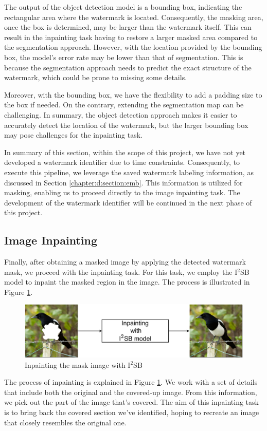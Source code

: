 The output of the object detection model is a bounding box, indicating the rectangular area where the watermark is located. Consequently, the masking area, once the box is determined, may be larger than the watermark itself. This can result in the inpainting task having to restore a larger masked area compared to the segmentation approach. However, with the location provided by the bounding box, the model's error rate may be lower than that of segmentation. This is because the segmentation approach needs to predict the exact structure of the watermark, which could be prone to missing some details.

Moreover, with the bounding box, we have the flexibility to add a padding size to the box if needed. On the contrary, extending the segmentation map can be challenging. In summary, the object detection approach makes it easier to accurately detect the location of the watermark, but the larger bounding box may pose challenges for the inpainting task.

In summary of this section, within the scope of this project, we have not yet developed a watermark identifier due to time constraints. Consequently, to execute this pipeline, we leverage the saved watermark labeling information, as discussed in Section \ref{chapter:d:section:emb}. This information is utilized for masking, enabling us to proceed directly to the image inpainting task. The development of the watermark identifier will be continued in the next phase of this project.
\subsection{Image Inpainting}
Finally, after obtaining a masked image by applying the detected watermark mask, we proceed with the inpainting task. For this task, we employ the I$^2$SB model to inpaint the masked region in the image. The process is illustrated in Figure \ref{figure:inpainting_arch}.
\begin{figure}[H]
 \centering
 \includegraphics[width=0.75\linewidth]{img/inpainting_arch.png}

 \caption{Inpainting the mask image with I$^2$SB}
 \label{figure:inpainting_arch}
\end{figure}
The process of inpainting is explained in Figure \ref{figure:inpainting_arch}. We work with a set of details that include both the original and the covered-up image. From this information, we pick out the part of the image that's covered. The aim of this inpainting task is to bring back the covered section we've identified, hoping to recreate an image that closely resembles the original one.
